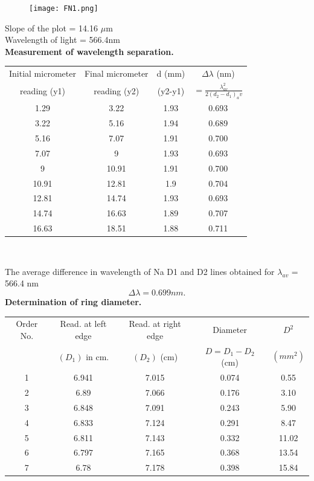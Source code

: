 \documentclass[12pt]{report}
\begin{document}
	\begin{figure}[h]
		\centering
		\texttt{[image: FN1.png]}
	\end{figure}
	Slope of the plot = 14.16 $\mu$m\\
	Wavelength of light = 566.4nm\\
	\newpage
	\textbf{Measurement of wavelength separation.}
	\begin{center}
		\begin{tabular}{ |c|c|c|c| } 
			\hline
			Initial micrometer&Final micrometer& d (mm) & $\Delta\lambda$ (nm)\\
			reading (y1) &reading (y2)&(y2-y1)&$= \frac{\lambda_{av}^2}{2(d_2-d_1)_av}$\\
			\hline
			1.29  & 3.22  & 1.93 & 0.693 \\
			3.22  & 5.16  & 1.94 & 0.689 \\
			5.16  & 7.07  & 1.91 & 0.700 \\
			7.07  & 9     & 1.93 & 0.693 \\
			9     & 10.91 & 1.91 & 0.700 \\
			10.91 & 12.81 & 1.9  & 0.704 \\
			12.81 & 14.74 & 1.93 & 0.693 \\
			14.74 & 16.63 & 1.89 & 0.707 \\
			16.63 & 18.51 & 1.88 & 0.711 \\
			\hline
		\end{tabular}
		\\
	\end{center}
	The average difference in wavelength of Na D1 and D2 lines obtained for $\lambda_{av}$ = 566.4 nm\\
	$$\Delta\lambda = 0.699 nm.$$
	\newpage
	\textbf{Determination of ring diameter.}
	\begin{center}
		\begin{tabular}{ |c|c|c|c|c| } 
			\hline
			Order No.&Read. at left edge&Read. at right edge&Diameter&$D^2$\\
			&$(D_1)$ in cm.&$(D_2)$ (cm)&$D=D_1-D_2$ (cm)&$(mm^2)$\\
			\hline
			1 & 6.941 & 7.015 & 0.074 & 0.55  \\
			2 & 6.89  & 7.066 & 0.176 & 3.10  \\
			3 & 6.848 & 7.091 & 0.243 & 5.90  \\
			4 & 6.833 & 7.124 & 0.291 & 8.47  \\
			5 & 6.811 & 7.143 & 0.332 & 11.02 \\
			6 & 6.797 & 7.165 & 0.368 & 13.54 \\
			7 & 6.78  & 7.178 & 0.398 & 15.84 \\
			\hline
		\end{tabular}
		\\
	\end{center}
\end{document}
